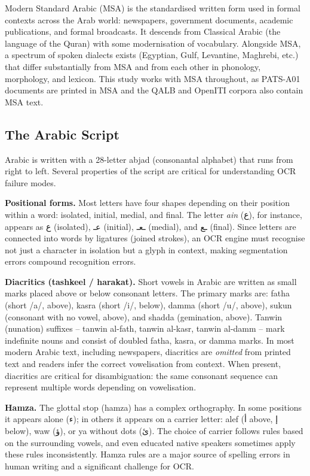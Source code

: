 Modern Standard Arabic (MSA) is the standardised written form used in formal
contexts across the Arab world: newspapers, government documents, academic
publications, and formal broadcasts.
It descends from Classical Arabic (the language of the Quran) with some
modernisation of vocabulary.
Alongside MSA, a spectrum of spoken dialects exists (Egyptian, Gulf, Levantine,
Maghrebi, etc.) that differ substantially from MSA and from each other in
phonology, morphology, and lexicon.
This study works with MSA throughout, as PATS-A01 documents are printed in MSA
and the QALB and OpenITI corpora also contain MSA text.

\subsection{The Arabic Script}
\label{subsec:arabic_script}

Arabic is written with a 28-letter abjad (consonantal alphabet) that runs
from right to left.
Several properties of the script are critical for understanding OCR failure modes.

\textbf{Positional forms.}
Most letters have four shapes depending on their position within a word:
isolated, initial, medial, and final.
The letter \textit{ain} (\textarabic{ع}), for instance, appears as
\textarabic{ع} (isolated), \textarabic{عـ} (initial), \textarabic{ـعـ} (medial),
and \textarabic{ـع} (final).
Since letters are connected into words by ligatures (joined strokes), an OCR
engine must recognise not just a character in isolation but a glyph in context,
making segmentation errors compound recognition errors.

\textbf{Diacritics (tashkeel / harakat).}
Short vowels in Arabic are written as small marks placed above or below
consonant letters.
The primary marks are: fatha (short /a/, above), kasra (short /i/, below),
damma (short /u/, above), sukun (consonant with no vowel, above), and shadda
(gemination, above).
Tanwin (nunation) suffixes -- tanwin al-fath, tanwin al-kasr, tanwin al-damm --
mark indefinite nouns and consist of doubled fatha, kasra, or damma marks.
In most modern Arabic text, including newspapers, diacritics are \emph{omitted}
from printed text and readers infer the correct vowelisation from context.
When present, diacritics are critical for disambiguation: the same consonant
sequence can represent multiple words depending on vowelisation.

\textbf{Hamza.}
The glottal stop (hamza) has a complex orthography.
In some positions it appears alone (\textarabic{ء}); in others it appears on a
carrier letter: alef (\textarabic{أ} above, \textarabic{إ} below), waw (\textarabic{ؤ}),
or ya without dots (\textarabic{ئ}).
The choice of carrier follows rules based on the surrounding vowels, and even
educated native speakers sometimes apply these rules inconsistently.
Hamza rules are a major source of spelling errors in human writing and a
significant challenge for OCR.

